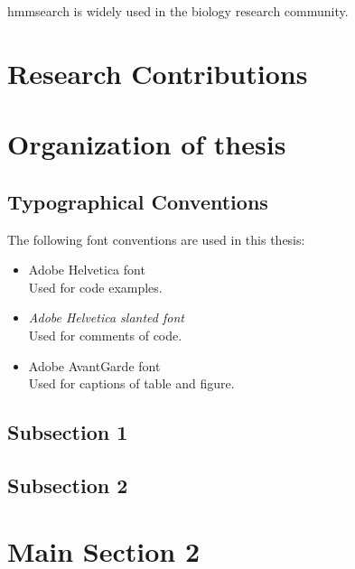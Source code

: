 hmmsearch is widely used in the biology
research community.



\section{Research Contributions}

\section{Organization of thesis}

\subsection*{Typographical Conventions}
The following font conventions are used in this thesis:
\begin{itemize}
 \item {\selectfont Adobe Helvetica font}\\
 Used for code examples.
 \item {\selectfont \textsl{Adobe Helvetica slanted font}}\\
 Used for comments of code.
 \item {\selectfont Adobe AvantGarde font}\\
 Used for captions of table and figure.
\end{itemize}


\subsection{Subsection 1}



\subsection{Subsection 2}


\section{Main Section 2}

